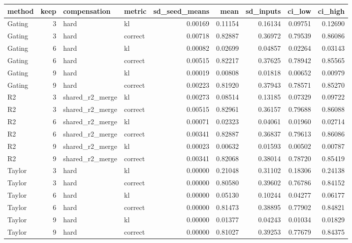 \begin{tabular}{lrllrrrrr}
\toprule
method & keep & compensation & metric & sd_seed_means & mean & sd_inputs & ci_low & ci_high \\
\midrule
Gating & 3 & hard & kl & 0.00169 & 0.11154 & 0.16134 & 0.09751 & 0.12690 \\
Gating & 3 & hard & correct & 0.00718 & 0.82887 & 0.36972 & 0.79539 & 0.86086 \\
Gating & 6 & hard & kl & 0.00082 & 0.02699 & 0.04857 & 0.02264 & 0.03143 \\
Gating & 6 & hard & correct & 0.00515 & 0.82217 & 0.37625 & 0.78942 & 0.85565 \\
Gating & 9 & hard & kl & 0.00019 & 0.00808 & 0.01818 & 0.00652 & 0.00979 \\
Gating & 9 & hard & correct & 0.00223 & 0.81920 & 0.37943 & 0.78571 & 0.85270 \\
R2 & 3 & shared_r2_merge & kl & 0.00273 & 0.08514 & 0.13185 & 0.07329 & 0.09722 \\
R2 & 3 & shared_r2_merge & correct & 0.00515 & 0.82961 & 0.36157 & 0.79688 & 0.86088 \\
R2 & 6 & shared_r2_merge & kl & 0.00071 & 0.02323 & 0.04061 & 0.01960 & 0.02714 \\
R2 & 6 & shared_r2_merge & correct & 0.00341 & 0.82887 & 0.36837 & 0.79613 & 0.86086 \\
R2 & 9 & shared_r2_merge & kl & 0.00023 & 0.00632 & 0.01593 & 0.00502 & 0.00787 \\
R2 & 9 & shared_r2_merge & correct & 0.00341 & 0.82068 & 0.38014 & 0.78720 & 0.85419 \\
Taylor & 3 & hard & kl & 0.00000 & 0.21048 & 0.31102 & 0.18306 & 0.24138 \\
Taylor & 3 & hard & correct & 0.00000 & 0.80580 & 0.39602 & 0.76786 & 0.84152 \\
Taylor & 6 & hard & kl & 0.00000 & 0.05130 & 0.10244 & 0.04277 & 0.06177 \\
Taylor & 6 & hard & correct & 0.00000 & 0.81473 & 0.38895 & 0.77902 & 0.84821 \\
Taylor & 9 & hard & kl & 0.00000 & 0.01377 & 0.04243 & 0.01034 & 0.01829 \\
Taylor & 9 & hard & correct & 0.00000 & 0.81027 & 0.39253 & 0.77679 & 0.84375 \\
\bottomrule
\end{tabular}
